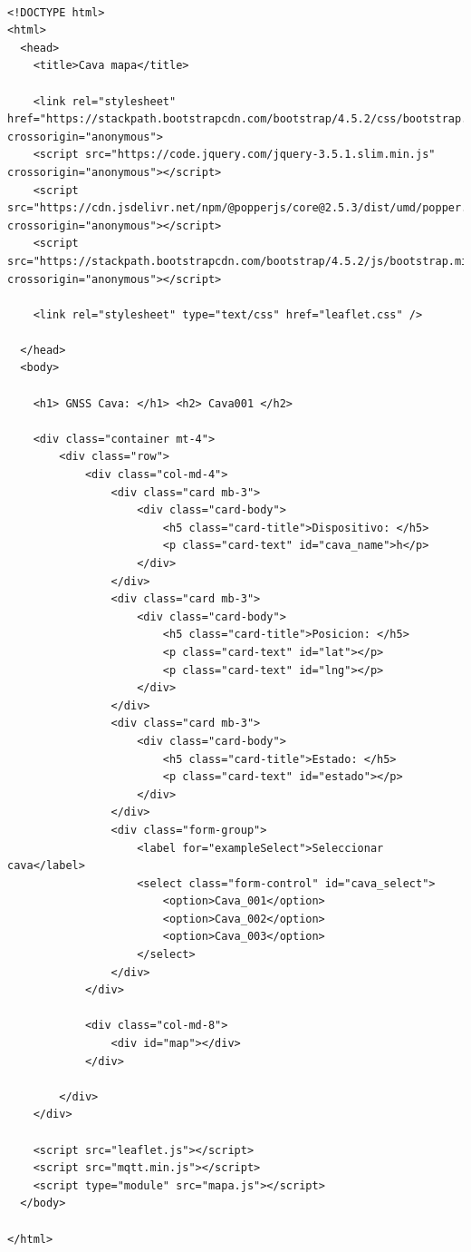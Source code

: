 \begin{lstlisting}[label=cod:aplicacion_web, caption=Pseudocódigo para la implementación HTML de la página web.] 

<!DOCTYPE html>
<html>
  <head>
    <title>Cava mapa</title>

    <link rel="stylesheet" href="https://stackpath.bootstrapcdn.com/bootstrap/4.5.2/css/bootstrap.min.css" crossorigin="anonymous">
    <script src="https://code.jquery.com/jquery-3.5.1.slim.min.js" crossorigin="anonymous"></script>
    <script src="https://cdn.jsdelivr.net/npm/@popperjs/core@2.5.3/dist/umd/popper.min.js" crossorigin="anonymous"></script>
    <script src="https://stackpath.bootstrapcdn.com/bootstrap/4.5.2/js/bootstrap.min.js" crossorigin="anonymous"></script>

    <link rel="stylesheet" type="text/css" href="leaflet.css" />
    
  </head>
  <body>

    <h1> GNSS Cava: </h1> <h2> Cava001 </h2> 

    <div class="container mt-4">
        <div class="row">
            <div class="col-md-4">
                <div class="card mb-3">
                    <div class="card-body">
                        <h5 class="card-title">Dispositivo: </h5>
                        <p class="card-text" id="cava_name">h</p>
                    </div>
                </div>
                <div class="card mb-3">
                    <div class="card-body">
                        <h5 class="card-title">Posicion: </h5>
                        <p class="card-text" id="lat"></p>
                        <p class="card-text" id="lng"></p>
                    </div>
                </div>
                <div class="card mb-3">
                    <div class="card-body">
                        <h5 class="card-title">Estado: </h5>
                        <p class="card-text" id="estado"></p>
                    </div>
                </div>
                <div class="form-group">
                    <label for="exampleSelect">Seleccionar cava</label>
                    <select class="form-control" id="cava_select">
                        <option>Cava_001</option>
                        <option>Cava_002</option>
                        <option>Cava_003</option>
                    </select>
                </div>
            </div>

            <div class="col-md-8">
                <div id="map"></div>
            </div>

        </div>
    </div>

    <script src="leaflet.js"></script>
    <script src="mqtt.min.js"></script>
    <script type="module" src="mapa.js"></script>
  </body>

</html>



\end{lstlisting}


